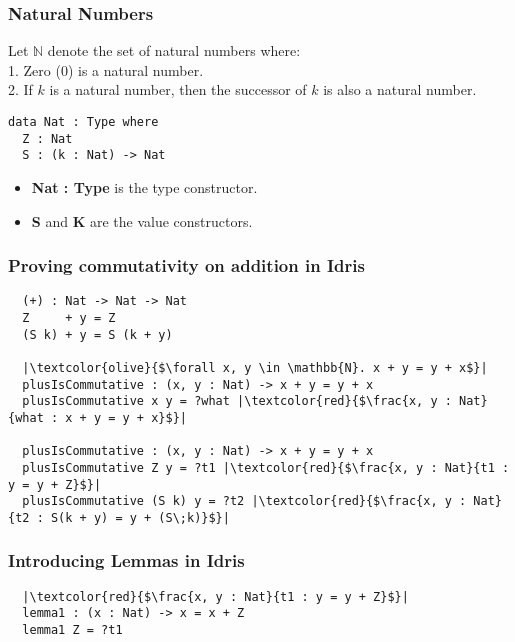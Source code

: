 \documentclass[usenames,dvipsnames]{beamer}
\begin{document}
\begin{frame}[fragile]
\frametitle{Natural Numbers}
Let $\mathbb{N}$ denote the set of natural numbers where: \\
1. Zero (0) is a natural number. \\
2. If $k$ is a natural number, then the successor of $k$ is also a natural
        number.

\begin{verbatim}
data Nat : Type where
  Z : Nat
  S : (k : Nat) -> Nat
\end{verbatim}
\begin{itemize}
  \item \textbf{Nat : Type} is the type constructor.
  \item \textbf{S} and \textbf{K} are the value constructors.
\end{itemize}
\end{frame}

\begin{frame}[fragile]
\end{frame}

\begin{frame}[fragile]
  \frametitle{Proving commutativity on addition in Idris}
  \begin{verbatim}
  (+) : Nat -> Nat -> Nat
  Z     + y = Z
  (S k) + y = S (k + y)

  |\textcolor{olive}{$\forall x, y \in \mathbb{N}. x + y = y + x$}|
  plusIsCommutative : (x, y : Nat) -> x + y = y + x
  plusIsCommutative x y = ?what |\textcolor{red}{$\frac{x, y : Nat}{what : x + y = y + x}$}|
  
  plusIsCommutative : (x, y : Nat) -> x + y = y + x
  plusIsCommutative Z y = ?t1 |\textcolor{red}{$\frac{x, y : Nat}{t1 : y = y + Z}$}|
  plusIsCommutative (S k) y = ?t2 |\textcolor{red}{$\frac{x, y : Nat}{t2 : S(k + y) = y + (S\;k)}$}|
  \end{verbatim}
\end{frame}

\begin{frame}[fragile]
  \frametitle{Introducing Lemmas in Idris}
  \begin{verbatim}
  |\textcolor{red}{$\frac{x, y : Nat}{t1 : y = y + Z}$}|
  lemma1 : (x : Nat) -> x = x + Z
  lemma1 Z = ?t1
  \end{verbatim}
\end{frame}
\end{document}
